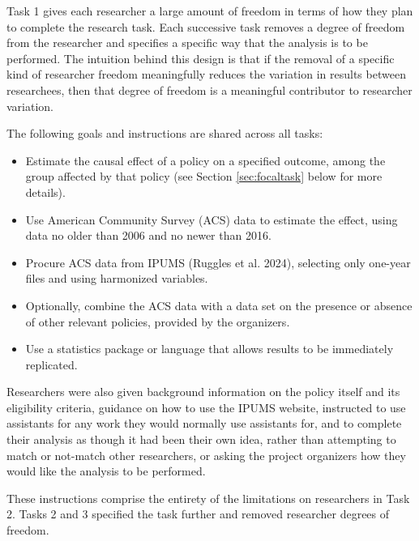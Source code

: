 \documentclass[
  letterpaper,
  DIV=11,
  numbers=noendperiod]{scrartcl}
\begin{document}
Task 1 gives each researcher a large amount of freedom in terms of how
they plan to complete the research task. Each successive task removes a
degree of freedom from the researcher and specifies a specific way that
the analysis is to be performed. The intuition behind this design is
that if the removal of a specific kind of researcher freedom
meaningfully reduces the variation in results between researchees, then
that degree of freedom is a meaningful contributor to researcher
variation.

The following goals and instructions are shared across all tasks:

\begin{itemize}
\item
  Estimate the causal effect of a policy on a specified outcome, among
  the group affected by that policy (see Section \ref{sec:focaltask}
  below for more details).
\item
  Use American Community Survey (ACS) data to estimate the effect, using
  data no older than 2006 and no newer than 2016.
\item
  Procure ACS data from IPUMS (Ruggles et al. 2024), selecting only
  one-year files and using harmonized variables.
\item
  Optionally, combine the ACS data with a data set on the presence or
  absence of other relevant policies, provided by the organizers.
\item
  Use a statistics package or language that allows results to be
  immediately replicated.
\end{itemize}

Researchers were also given background information on the policy itself
and its eligibility criteria, guidance on how to use the IPUMS website,
instructed to use assistants for any work they would normally use
assistants for, and to complete their analysis as though it had been
their own idea, rather than attempting to match or not-match other
researchers, or asking the project organizers how they would like the
analysis to be performed.

These instructions comprise the entirety of the limitations on
researchers in Task 2. Tasks 2 and 3 specified the task further and
removed researcher degrees of freedom.
\end{document}
